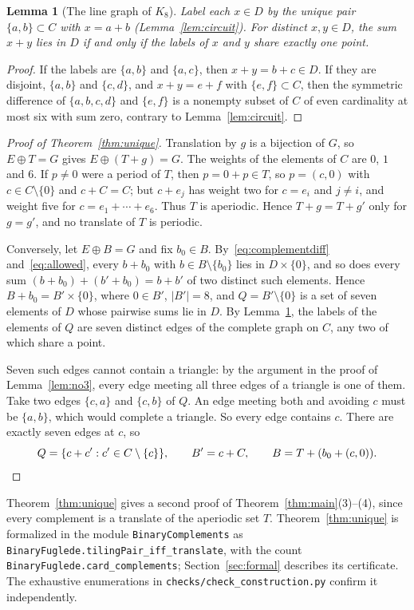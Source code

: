 \documentclass[11pt]{article}
\newtheorem{lemma}[theorem]{Lemma}
\theoremstyle{definition}\newtheorem{definition}[theorem]{Definition}
\theoremstyle{remark}\newtheorem{remark}[theorem]{Remark}
\newcommand{\code}[1]{\texttt{\small #1}}
\newcommand{\modname}[1]{\texttt{\footnotesize #1}}
\newcommand{\uniquestatus}{Theorem~\ref{thm:unique} is formalized in the module \modname{BinaryComplements} as \nolinkurl{BinaryFuglede.tilingPair_iff_translate}, with the count \nolinkurl{BinaryFuglede.card_complements}; Section~\ref{sec:formal} describes its certificate. The exhaustive enumerations in \code{checks/check\_construction.py} confirm it independently.}
\begin{document}
\begin{lemma}[The line graph of $K_8$]\label{lem:linegraph}
Label each $x\in D$ by the unique pair $\{a,b\}\subset C$ with $x=a+b$ (Lemma~\ref{lem:circuit}). For distinct $x,y\in D$, the sum $x+y$ lies in $D$ if and only if the labels of $x$ and $y$ share exactly one point.
\end{lemma}

\begin{proof}
If the labels are $\{a,b\}$ and $\{a,c\}$, then $x+y=b+c\in D$. If they are disjoint, $\{a,b\}$ and $\{c,d\}$, and $x+y=e+f$ with $\{e,f\}\subset C$, then the symmetric difference of $\{a,b,c,d\}$ and $\{e,f\}$ is a nonempty subset of $C$ of even cardinality at most six with sum zero, contrary to Lemma~\ref{lem:circuit}.
\end{proof}

\begin{proof}[Proof of Theorem~\ref{thm:unique}]
Translation by $g$ is a bijection of $G$, so $E\oplus T=G$ gives $E\oplus(T+g)=G$. The weights of the elements of $C$ are $0$, $1$ and $6$. If $p\ne0$ were a period of $T$, then $p=0+p\in T$, so $p=(c,0)$ with $c\in C\setminus\{0\}$ and $c+C=C$; but $c+e_j$ has weight two for $c=e_i$ and $j\ne i$, and weight five for $c=e_1+\cdots+e_6$. Thus $T$ is aperiodic. Hence $T+g=T+g'$ only for $g=g'$, and no translate of $T$ is periodic.

Conversely, let $E\oplus B=G$ and fix $b_0\in B$. By~\eqref{eq:complementdiff} and~\eqref{eq:allowed}, every $b+b_0$ with $b\in B\setminus\{b_0\}$ lies in $D\times\{0\}$, and so does every sum $(b+b_0)+(b'+b_0)=b+b'$ of two distinct such elements. Hence $B+b_0=B'\times\{0\}$, where $0\in B'$, $|B'|=8$, and $Q=B'\setminus\{0\}$ is a set of seven elements of $D$ whose pairwise sums lie in $D$. By Lemma~\ref{lem:linegraph}, the labels of the elements of $Q$ are seven distinct edges of the complete graph on $C$, any two of which share a point.

Seven such edges cannot contain a triangle: by the argument in the proof of Lemma~\ref{lem:no3}, every edge meeting all three edges of a triangle is one of them. Take two edges $\{c,a\}$ and $\{c,b\}$ of $Q$. An edge meeting both and avoiding $c$ must be $\{a,b\}$, which would complete a triangle. So every edge contains $c$. There are exactly seven edges at $c$, so
\[
Q=\{c+c':c'\in C\setminus\{c\}\},\qquad B'=c+C,\qquad B=T+(b_0+(c,0)).\qedhere
\]
\end{proof}

Theorem~\ref{thm:unique} gives a second proof of Theorem~\ref{thm:main}(3)--(4), since every complement is a translate of the aperiodic set $T$. \uniquestatus
\end{document}
